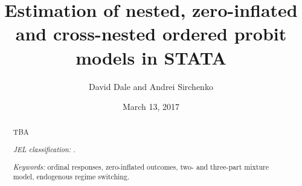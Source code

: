 \documentclass[letterpaper,fleqn,11pt]{article}
\begin{document}
\title{Estimation of nested, zero-inflated and cross-nested ordered probit
models in STATA\\
\bigskip \bigskip }
\author{David Dale and Andrei Sirchenko}
\date{March 13, 2017}
\maketitle

\begin{abstract}
TBA

\bigskip \bigskip \bigskip \bigskip

\textit{JEL classification:} \bigskip .

\textit{Keywords:} ordinal responses, zero-inflated outcomes, two- and
three-part mixture model, endogenous regime switching.
\end{abstract}
\end{document}
